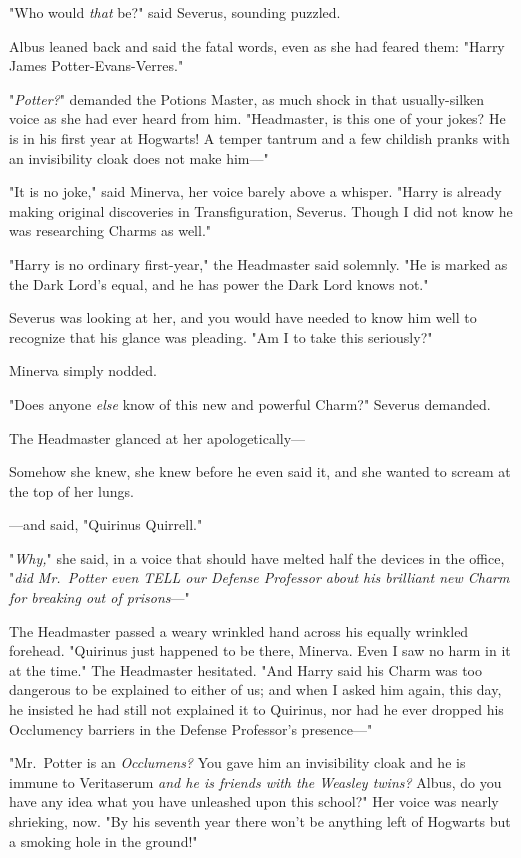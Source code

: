"Who would \emph{that} be?" said Severus, sounding puzzled.

Albus leaned back and said the fatal words, even as she had feared them: "Harry
James Potter-Evans-Verres."

"\emph{Potter?}" demanded the Potions Master, as much shock in that
usually-silken voice as she had ever heard from him. "Headmaster, is this one
of your jokes? He is in his first year at Hogwarts! A temper tantrum and a few
childish pranks with an invisibility cloak does not make him---"

"It is no joke," said Minerva, her voice barely above a whisper. "Harry is
already making original discoveries in Transfiguration, Severus. Though I did
not know he was researching Charms as well."

"Harry is no ordinary first-year," the Headmaster said solemnly. "He is marked
as the Dark Lord's equal, and he has power the Dark Lord knows not."

Severus was looking at her, and you would have needed to know him well to
recognize that his glance was pleading. "Am I to take this seriously?"

Minerva simply nodded.

"Does anyone \emph{else} know of this{\el} new and powerful Charm?" Severus
demanded.

The Headmaster glanced at her apologetically---

Somehow she knew, she knew before he even said it, and she wanted to scream at
the top of her lungs.

---and said, "Quirinus Quirrell."

"\emph{Why,}" she said, in a voice that should have melted half the devices in
the office, "\emph{did Mr.~Potter even TELL our Defense Professor about his
brilliant new Charm for breaking out of prisons}---"

The Headmaster passed a weary wrinkled hand across his equally wrinkled
forehead. "Quirinus just happened to be there, Minerva. Even I saw no harm in
it at the time." The Headmaster hesitated. "And Harry said his Charm was too
dangerous to be explained to either of us; and when I asked him again, this
day, he insisted he had still not explained it to Quirinus, nor had he ever
dropped his Occlumency barriers in the Defense Professor's presence---"

"Mr.~Potter is an \emph{Occlumens?} You gave him an invisibility cloak and he
is immune to Veritaserum \emph{and he is friends with the Weasley twins?}
Albus, do you have any idea what you have unleashed upon this school?" Her
voice was nearly shrieking, now. "By his seventh year there won't be anything
left of Hogwarts but a smoking hole in the ground!"

